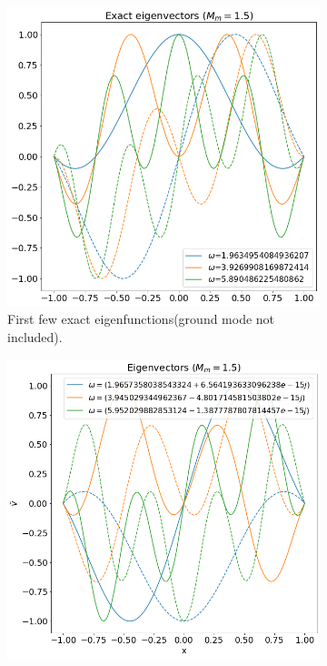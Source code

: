 \documentclass{article}
\theoremstyle{plain}
\theoremstyle{definition}
\theoremstyle{remark}
\theoremstyle{remark}
\begin{document}
\begin{figure}[H]
    \centering
    \begin{subfigure}[b]{0.45\linewidth}
        \includegraphics[width=\linewidth]{img/eigenfunctions-constant-v-exact.png}
        \caption{First few exact eigenfunctions(ground mode not included).}
    \end{subfigure}%
    \begin{subfigure}[b]{0.45\linewidth}
        \includegraphics[width=\linewidth]{img/eigenfunctions-constant-v.png}

\end{subfigure}
\end{figure}
\end{document}
